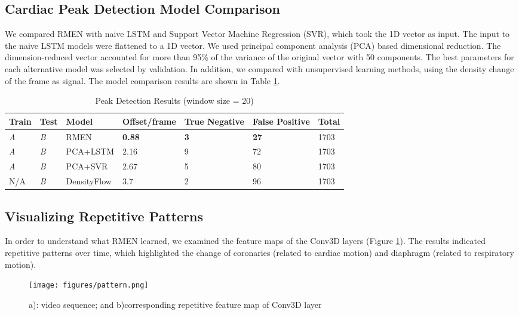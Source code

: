 \documentclass{article}
\begin{document}
\subsection{Cardiac Peak Detection Model Comparison}
We compared RMEN with naive LSTM and Support Vector Machine Regression (SVR), which took the 1D vector as input. The input to the naive LSTM models were flattened to a 1D vector.  We used principal component analysis (PCA) based dimensional reduction. The dimension-reduced vector accounted for more than 95\% of the variance of the original vector with 50 components. The best parameters for each alternative model was selected by validation. In addition, we compared with unsupervised learning methods, using the density change of the frame as signal. The model comparison results are shown in Table \ref{methodcompare}.

\begin{table}
  \caption{Peak Detection Results (window size = 20)}
  \centering
  \begin{tabular}{p{1cm}<{\centering} p{1cm}<{\centering} p{1.5cm}<{\centering} p{2cm}<{\centering} p{2cm}<{\centering}p{2cm}<{\centering}p{1cm}<{\centering}  } %
    \toprule
   Train  & Test  & Model & Offset/frame & True Negative & False Positive& Total   \\
    \midrule
 \textit{A} & \textit{B}&  RMEN & \textbf{0.88} & \textbf{3}& \textbf{27} & 1703 \\
   \textit{A}  & \textit{B} & PCA+LSTM & 2.16& 9& 72 & 1703\\
   \textit{A}  & \textit{B} & PCA+SVR& 2.67 &5& 80 & 1703\\
   N/A & \textit{B}& DensityFlow& 3.7& 2& 96 & 1703 \\
    \bottomrule
  \end{tabular}
  \label{methodcompare}
\end{table}
\vspace{-4mm}
\subsection{Visualizing Repetitive Patterns}
In order to understand what RMEN learned, we examined the feature maps of the Conv3D layers (Figure \ref{pattern}). The results indicated repetitive patterns over time, which highlighted the change of coronaries (related to cardiac motion) and diaphragm (related to respiratory motion).
\begin{figure}[htpb]
	\centering
    \texttt{[image: figures/pattern.png]}
    \caption{a): video sequence; and b)corresponding repetitive feature map of Conv3D layer }
    \label{pattern}   
\end{figure}
\vspace{-4mm}
\end{document}
